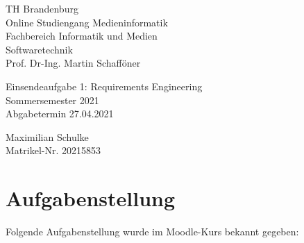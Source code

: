 \documentclass{article}
\begin{document}
\begin{titlepage}
	\begin{flushleft}
		TH Brandenburg \\
		Online Studiengang Medieninformatik \\
		Fachbereich Informatik und Medien \\
		Softwaretechnik \\
		Prof. Dr-Ing. Martin Schafföner
	\end{flushleft}

	\vfill

	\begin{center}
		\Large{Einsendeaufgabe 1: Requirements Engineering}\\[0.5em]
		\large{Sommersemester 2021}\\[0.25em]
		\large{Abgabetermin 27.04.2021}
	\end{center}

	\vfill

	\begin{flushright}
		Maximilian Schulke \\
		Matrikel-Nr. 20215853
	\end{flushright}
\end{titlepage}

\tableofcontents

\newpage

\section{Aufgabenstellung}

Folgende Aufgabenstellung wurde im Moodle-Kurs bekannt gegeben:
\end{document}
